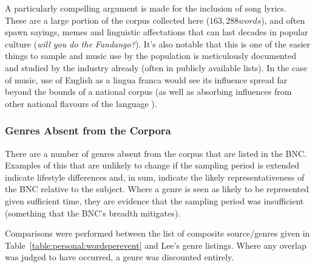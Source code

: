 A particularly compelling argument is made for the inclusion of song lyrics.  These are a large portion of the corpus collected here  ($163,288 words$), and often spawn sayings, memes and linguistic affectations that can last decades in popular culture (\textit{will you do the Fandango?}).  It's also notable that this is one of the easier things to sample and music use by the population is meticulously documented and studied by the industry already (often in publicly available lists).  In the case of music, use of English as a lingua franca would see its influence spread far beyond the bounds of a national corpus (as well as absorbing influences from other national flavours of the language%
).









\subsubsection{Genres Absent from the Corpora}
There are a number of genres absent from the corpus that are listed in the BNC.  Examples of this that are unlikely to change if the sampling period is extended indicate lifestyle differences and, in sum, indicate the likely representativeness of the BNC relative to the subject.  Where a genre is seen as likely to be represented given sufficient time, they are evidence that the sampling period was insufficient (something that the BNC's breadth mitigates).

Comparisons were performed between the list of composite source/genres given in Table~\ref{table:personal:wordsperevent} and Lee's genre listings.  Where any overlap was judged to have occurred, a genre was discounted entirely.


